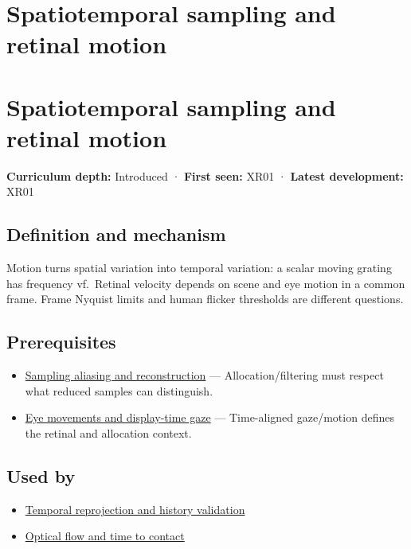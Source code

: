 \hypertarget{appendix-70895739febb}{}
\section*{Spatiotemporal sampling and retinal motion}
\section{Spatiotemporal sampling and retinal motion}\label{appendix-70895739febb-spatiotemporal-sampling-and-retinal-motion}

\textbf{Curriculum depth:} Introduced · \textbf{First seen:} XR01 · \textbf{Latest development:} XR01

\subsection{Definition and mechanism}\label{appendix-70895739febb-definition-and-mechanism}

Motion turns spatial variation into temporal variation: a scalar moving grating has frequency \textbar v\textbar f.~Retinal velocity depends on scene and eye motion in a common frame. Frame Nyquist limits and human flicker thresholds are different questions.

\subsection{Prerequisites}\label{appendix-70895739febb-prerequisites}

\begin{itemize}
\tightlist
\item
  \hyperref[appendix-6a7869dd79a6]{Sampling aliasing and reconstruction} --- Allocation/filtering must respect what reduced samples can distinguish.
\item
  \hyperref[appendix-a6f2c4fe1996]{Eye movements and display-time gaze} --- Time-aligned gaze/motion defines the retinal and allocation context.
\end{itemize}

\subsection{Used by}\label{appendix-70895739febb-used-by}

\begin{itemize}
\tightlist
\item
  \hyperref[appendix-0727340a4428]{Temporal reprojection and history validation}
\item
  \hyperref[appendix-e2e73f8cd93e]{Optical flow and time to contact}
\end{itemize}

